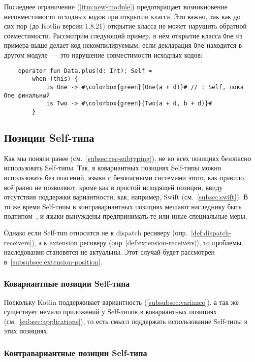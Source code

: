 Последнее ограничение (\ref{itm:new-module}) предотвращает возникновение несовместимости исходных кодов при открытии класса.
Это важно, так как до сих пор (до Kotlin версии 1.8.21) открытие класса не может нарушить обратной совместимости.
Рассмотрим следующий пример, в нём открытие класса \texttt{One} из примера выше делает код некомпилируемым, если декларация \texttt{One} находится в другом модуле~--- это нарушение совместимости исходных кодов:

\begin{verbatim}
    operator fun Data.plus(d: Int): Self =
        when (this) {
            is One -> #\colorbox{green}{One(a + d)}# // : Self, пока One финальный
            is Two -> #\colorbox{green}{Two(a + d, b + d)}#
        }
\end{verbatim}


\subsection{Позиции Self-типа} \label{subsec:self-positions}

Как мы поняли ранее (см.~\ref{subsec:rec-subtyping}), не во всех позициях безопасно использовать Self-типы.
Так, в ковариантных позициях Self-типы можно использовать без опасений, языки с безопасными системами этого, как правило, всё равно не позволяют, кроме как в простой исходящей позиции, ввиду отсутствия поддержки вариантности, как, например, Swift (см.~\ref{subsec:swift}).
В то же время Self-типы в контравариантных позициях мешают наследнику быть подтипом~\cite{cook1989inheritance}, и языки вынуждены предпринимать те или иные специальные меры.

Однако если Self-тип относится не к dispatch ресиверу (опр.~\ref{def:dispatch-receivers}), а к extension ресиверу (опр~\ref{def:extension-receivers}), то проблемы наследования становятся не актуальны.
Этот случай будет рассмотрен в~\ref{subsubsec:extension-position}.

\subsubsection{Ковариантные позиции Self-типа}

Поскольку Kotlin поддерживает вариантность (\ref{subsubsec:variance}), а так же существует немало приложений у Self-типов в ковариантных позициях (см.~\ref{subsec:applications}), то есть смысл поддержать использование Self-типы в этих позициях.

\subsubsection{Контравариантные позиции Self-типа}

